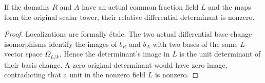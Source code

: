 \begin{lemma}\label{lem:sc0-relative-differential-det-nonzero}
\leanok
{}
If the domains $R$ and $A$ have an actual common fraction field $L$ and the maps
form the original scalar tower, their relative differential determinant is nonzero.
\end{lemma}
\begin{proof}
Localizations are formally \'etale. The two actual differential base-change
isomorphisms identify the images of $b_R$ and $b_A$ with two bases of the same
$L$-vector space $\Omega_{L/k}$. Hence the determinant's image in $L$ is the unit
determinant of their basis change. A zero original determinant would have zero
image, contradicting that a unit in the nonzero field $L$ is nonzero.
\end{proof}
